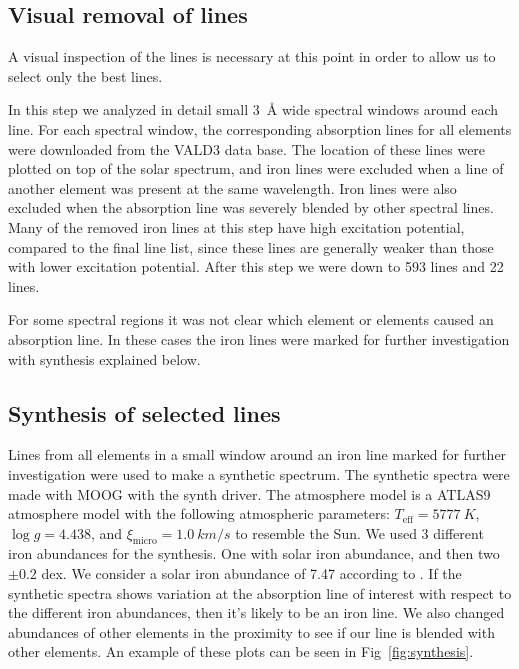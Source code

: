 \documentclass{aa}
\begin{document}
\subsection{Visual removal of lines}
\label{sub:visual_removal_of_lines}

A visual inspection of the lines is necessary at this
point in order to allow us to select only the best lines.

In this step we analyzed in detail small \SI{3}{\angstrom} wide spectral
windows around each line. For each spectral window, the corresponding
absorption lines for all elements were downloaded from the VALD3 data
base. The location of these lines were plotted on top of the solar
spectrum, and iron lines were excluded when a line of another element
was present at the same wavelength. Iron lines were also excluded when
the absorption line was severely blended by other spectral lines. Many
of the removed iron lines at this step have high excitation potential,
compared to the final line list, since these lines are generally weaker
than those with lower excitation potential. After this step
we were down to 593  lines and 22  lines.

For some spectral regions it was not clear which element or elements
caused an absorption line. In these cases the iron lines were marked for
further investigation with synthesis explained below.


\subsection{Synthesis of selected lines}
\label{sub:synthesis_of_selected_lines}

Lines from all elements in a small window around an iron line marked
for further investigation were used to make a synthetic spectrum.
The synthetic spectra were made with MOOG with the synth driver. The
atmosphere model is a ATLAS9 atmosphere model \citep{Kurucz1993} with
the following atmospheric parameters: $T_\mathrm{eff}=\SI{5777}{K}$,
$\log g = 4.438$, and $\xi_\mathrm{micro} = \SI{1.0}{km/s}$ to resemble
the Sun. We used 3 different iron abundances for the synthesis. One
with solar iron abundance, and then two $\pm0.2$ dex. We consider a solar iron
abundance of 7.47 according to \cite{Gonzalez2000}. If the synthetic
spectra shows variation at the absorption line of interest with respect
to the different iron abundances, then it's likely to be an iron line.
We also changed abundances of other elements in the proximity to see if
our line is blended with other elements. An example of these plots can
be seen in Fig~\ref{fig:synthesis}.
\end{document}
